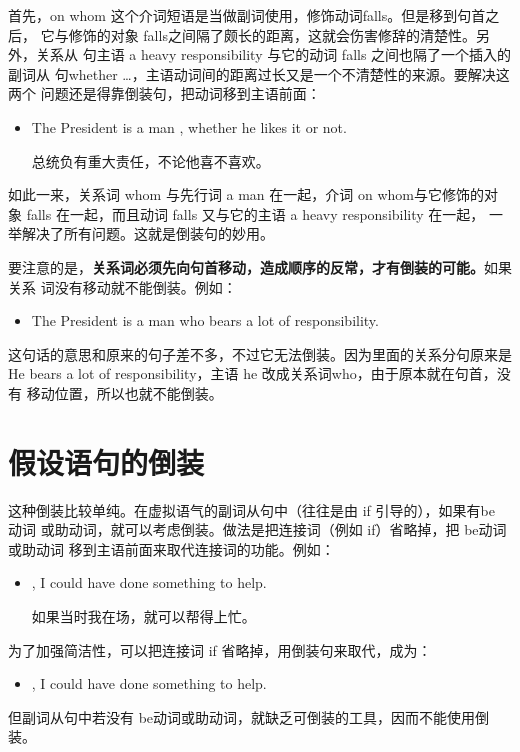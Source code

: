首先，on whom 这个介词短语是当做副词使用，修饰动词falls。但是移到句首之后，
它与修饰的对象 falls之间隔了颇长的距离，这就会伤害修辞的清楚性。另外，关系从
句主语 a heavy responsibility 与它的动词 falls 之间也隔了一个插入的副词从
句whether \ldots{}，主语动词间的距离过长又是一个不清楚性的来源。要解决这两个
问题还是得靠倒装句，把动词移到主语前面：
\begin{itemize}
\item The President is a man ,
  whether he likes it or not.

  总统负有重大责任，不论他喜不喜欢。
\end{itemize}
如此一来，关系词 whom 与先行词 a man 在一起，介词 on whom与它修饰的对
象 falls 在一起，而且动词 falls 又与它的主语 a heavy responsibility 在一起，
一举解决了所有问题。这就是倒装句的妙用。

要注意的是，\textbf{关系词必须先向句首移动，造成顺序的反常，才有倒装的可能。}如果关系
词没有移动就不能倒装。例如：
\begin{itemize}
\item The President is a man who bears a lot of responsibility.
\end{itemize}
这句话的意思和原来的句子差不多，不过它无法倒装。因为里面的关系分句原来是He
bears a lot of responsibility，主语 he 改成关系词who，由于原本就在句首，没有
移动位置，所以也就不能倒装。

\section{假设语句的倒装}

这种倒装比较单纯。在虚拟语气的副词从句中（往往是由 if 引导的），如果有be 动词
或助动词，就可以考虑倒装。做法是把连接词（例如 if）省略掉，把 be动词或助动词
移到主语前面来取代连接词的功能。例如：
\begin{itemize}
\item {}, I could have done something to help.

  如果当时我在场，就可以帮得上忙。
\end{itemize}
为了加强简洁性，可以把连接词 if 省略掉，用倒装句来取代，成为：
\begin{itemize}
\item {}, I could have done something to help.
\end{itemize}

但副词从句中若没有 be动词或助动词，就缺乏可倒装的工具，因而不能使用倒装。

